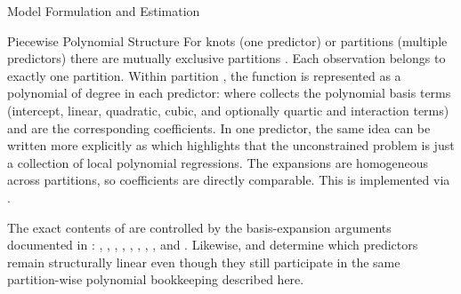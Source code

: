 \begin{Section}{Model Formulation and Estimation}


%
\begin{SubSection}{Piecewise Polynomial Structure}
For  knots (one predictor) or  partitions (multiple
predictors) there are  mutually exclusive partitions
. Each observation 
belongs to exactly one partition. Within partition , the function is
represented as a polynomial of degree  in each predictor:
where  collects the polynomial basis terms (intercept,
linear, quadratic, cubic, and optionally quartic and interaction terms) and
 are the corresponding coefficients. In
one predictor, the same idea can be written more explicitly as
which highlights that the unconstrained problem is just a collection of
local polynomial regressions. The expansions are homogeneous across
partitions, so coefficients are directly comparable. This is implemented via
.

The exact contents of  are controlled by the basis-expansion
arguments documented in : ,
, ,
, ,
, ,
, and . Likewise,
 and
 determine which predictors remain
structurally linear even though they still participate in the same
partition-wise polynomial bookkeeping described here.


\end{SubSection}
\end{Section}
